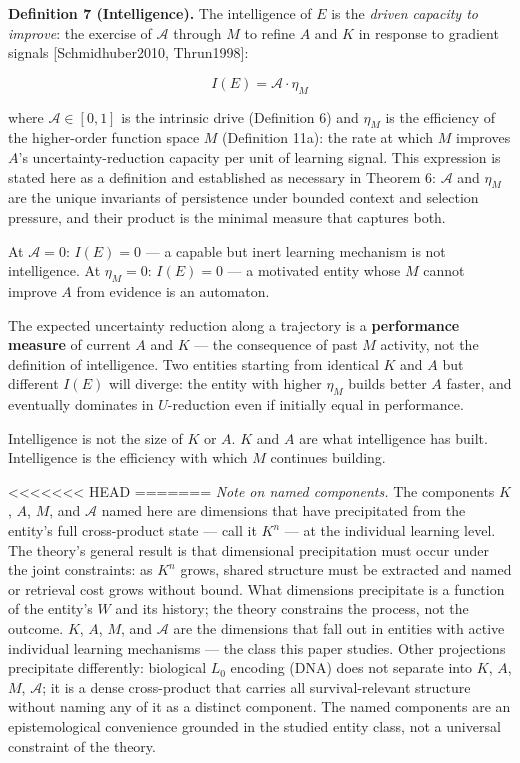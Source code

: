 \documentclass[
]{article}
\begin{document}
\textbf{Definition 7 (Intelligence).} The intelligence of \(E\) is the
\emph{driven capacity to improve}: the exercise of \(\mathcal{A}\)
through \(M\) to refine \(A\) and \(K\) in response to gradient signals
{[}Schmidhuber2010, Thrun1998{]}:

\[I(E) = \mathcal{A} \cdot \eta_M\]

where \(\mathcal{A} \in [0, 1]\) is the intrinsic drive (Definition 6)
and \(\eta_M\) is the efficiency of the higher-order function space
\(M\) (Definition 11a): the rate at which \(M\) improves \(A\)'s
uncertainty-reduction capacity per unit of learning signal. This
expression is stated here as a definition and established as necessary
in Theorem 6: \(\mathcal{A}\) and \(\eta_M\) are the unique invariants
of persistence under bounded context and selection pressure, and their
product is the minimal measure that captures both.

At \(\mathcal{A} = 0\): \(I(E) = 0\) --- a capable but inert learning
mechanism is not intelligence. At \(\eta_M = 0\): \(I(E) = 0\) --- a
motivated entity whose \(M\) cannot improve \(A\) from evidence is an
automaton.

The expected uncertainty reduction along a trajectory is a
\textbf{performance measure} of current \(A\) and \(K\) --- the
consequence of past \(M\) activity, not the definition of intelligence.
Two entities starting from identical \(K\)
and \(A\) but different \(I(E)\) will diverge: the entity with higher
\(\eta_M\) builds better \(A\) faster, and eventually dominates in
\(U\)-reduction even if initially equal in performance.

Intelligence is not the size of \(K\) or \(A\). \(K\) and \(A\) are what
intelligence has built. Intelligence is the efficiency with which \(M\)
continues building.

<<<<<<< HEAD
=======
\emph{Note on named components.} The components \(K\), \(A\), \(M\), and
\(\mathcal{A}\) named here are dimensions that have precipitated from
the entity's full cross-product state --- call it \(K^n\) --- at the
individual learning level. The theory's general result is that
dimensional precipitation must occur under the joint constraints: as
\(K^n\) grows, shared structure must be extracted and named or retrieval
cost grows without bound. What dimensions precipitate is a function of
the entity's \(W\) and its history; the theory constrains the process,
not the outcome. \(K\), \(A\), \(M\), and \(\mathcal{A}\) are the
dimensions that fall out in entities with active individual learning
mechanisms --- the class this paper studies. Other projections
precipitate differently: biological \(L_0\) encoding (DNA) does not
separate into \(K\), \(A\), \(M\), \(\mathcal{A}\); it is a dense
cross-product that carries all survival-relevant structure without
naming any of it as a distinct component. The named components are an
epistemological convenience grounded in the studied entity class, not a
universal constraint of the theory.
\end{document}
